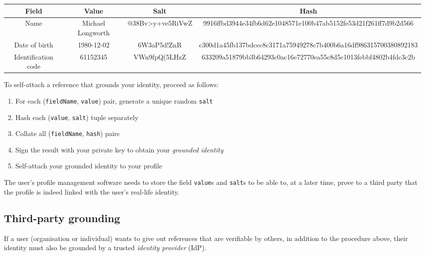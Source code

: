 \documentclass[a4paper, bibliography=totoc, titlepage=false]{scrartcl}
\begin{document}
\vspace{2.5mm}
\begin{adjustbox}{max width=\textwidth}
	\begin{tabular}{c|c|c|c}
		\textbf{Field} & \textbf{Value} & \textbf{Salt} & \textbf{Hash} \\
		\hline
		Name & Michael Longworth & @38Bv>y+ve5RiVwZ & 9916ffbd3944e34fb6d62e1048571e100b47ab5152fe53d21f261ff7d9b2d566 \\
		\hline
		Date of birth & 1980-12-02 & 6W3aP5d!ZnR & c300d1a45fb137bdcec8c3171a75949278c7b400b6a16df986315700380892183 \\
		\hline
		Identification code & 61152345 & VWn9fpQ(5LHzZ & 633209a51879bb3b64293c0ac16e72770ea55c8d5c1013febbf4802b4fdc3c2b \\
	\end{tabular}
\end{adjustbox}
\vspace{2.5mm}

To self-attach a reference that grounds your identity, proceed as follows:

\begin{enumerate}
	\item For each (\texttt{fieldName}, \texttt{value}) pair, generate a unique random \texttt{salt}
	\item Hash each (\texttt{value}, \texttt{salt}) tuple separately
	\item Collate all (\texttt{fieldName}, \texttt{hash}) pairs
	\item Sign the result with your private key to obtain your \emph{grounded identity}
	\item Self-attach your grounded identity to your profile
\end{enumerate}

The user's profile management software needs to store the field \texttt{value}s and \texttt{salt}s to be able to, at a later time, prove to a third party that the profile is indeed linked with the user's real-life identity.

\subsection{Third-party grounding}

If a user (organisation or individual) wants to give out references that are verifiable by others, in addition to the procedure above, their identity must also be grounded by a trusted \emph{identity provider} (IdP).
\end{document}
